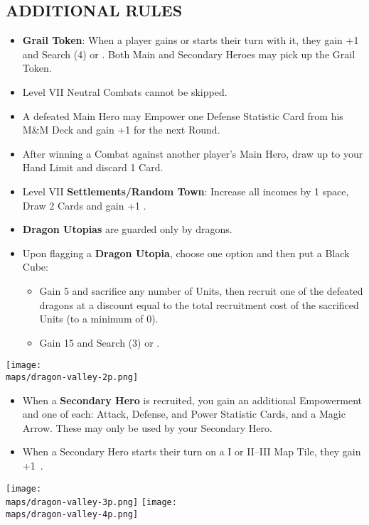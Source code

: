 \begin{multicols*}{2}
\subsection*{\MakeUppercase{Additional Rules}}
\begin{itemize}
  \item \textbf{Grail Token}: When a player gains or starts their turn with it, they gain +1  and Search (4)  or . Both Main and Secondary Heroes may pick up the Grail Token.
  \item Level VII Neutral Combats cannot be skipped.
  \item A defeated Main Hero may Empower one Defense Statistic Card from his M\&M Deck and gain +1  for the next Round.
  \item After winning a Combat against another player's Main Hero, draw up to your Hand Limit and discard 1 Card.
  \item Level VII \textbf{Settlements/Random Town}: Increase all incomes by 1 space, Draw 2 Cards and gain +1 .
  \item \textbf{Dragon Utopias} are guarded only by dragons.
  \item Upon flagging a \textbf{Dragon Utopia}, choose one option and then put a Black Cube:
  \begin{itemize}
    \item Gain 5  and sacrifice any number of Units, then recruit one of the defeated dragons at a discount equal to the total recruitment cost of the sacrificed Units (to a minimum of 0).
    \item Gain 15  and Search (3)  or .
  \end{itemize}
\end{itemize}

\begin{center}
  \vspace*{\fill}
  \texttt{[image: \\maps/dragon-valley-2p.png]}
\end{center}

\begin{itemize}
  \item When a \textbf{Secondary Hero} is recruited, you gain an additional Empowerment and one of each: Attack, Defense, and Power Statistic Cards, and a Magic Arrow. These may only be used by your Secondary Hero.
  \item When a Secondary Hero starts their turn on a I or II--III Map Tile, they gain +1~.
\end{itemize}

\begin{center}
  \vspace*{\fill}
  \texttt{[image: \\maps/dragon-valley-3p.png]}
  \vspace*{\fill}
  \texttt{[image: \\maps/dragon-valley-4p.png]}
\end{center}

\end{multicols*}
